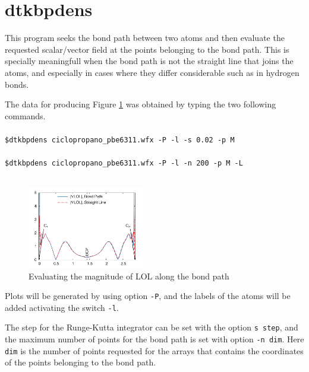 \section{dtkbpdens}

This program seeks the bond path between two atoms and then evaluate the requested scalar/vector field at the points belonging to the bond path. This is specially meaningfull when the bond path is not the straight line that joins the atoms, and especially in cases where they differ considerable such as in hydrogen bonds.

The data for producing Figure \ref{fig:dtkbpdensusex} was obtained by typing the two following commands.\\
\phantom{M}\\
\texttt{\phantom{MMM}\$dtkbpdens ciclopropano\_pbe6311.wfx -P -l -s 0.02 -p M}\\\phantom{M}\\
\texttt{\phantom{MMM}\$dtkbpdens ciclopropano\_pbe6311.wfx -P -l -n 200 -p M -L}\\\phantom{M}\\
%
\begin{figure}[ht!]
\centering
\includegraphics[width=0.45\textwidth]{cyclopropaneBPSLMagGradLOL-C1-C2}
\caption{Evaluating the magnitude of LOL along the bond path}\label{fig:dtkbpdensusex}
\end{figure}
%

Plots will be generated by using option \texttt{-P}, and the labels of the atoms will be added activating the switch \texttt{-l}.

The step for the Runge-Kutta integrator can be set with the option \texttt{s step}, and the maximum number of points for the bond path is set with option \texttt{-n dim}. Here \texttt{dim} is the number of points requested for the arrays that contains the coordinates of the points belonging to the bond path.

